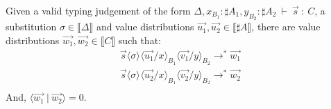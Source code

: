 \documentclass[runningheads,orivec,envcountsame,envcountsect]{llncs}
\newcommand\lra{\longrightarrow}
\newcommand\ansubst[2]{\ensuremath{\langle #1 \rangle_{#2}}}
\def\scal#1#2{\langle{#1}~|~{#2}\rangle}
\def\eval{\lra^*}
\def\sem#1{\llbracket#1\rrbracket}
\def\TYP#1#2#3{#1~{\vdash}~#2~{:}~#3}
\begin{document}
\begin{lemma}\label{lem:OrthogonalSubstitution} %
Given a valid typing judgement of the form $\TYP{\Delta, x_{B_1}:\sharp A_1, y_{B_2}: \sharp A_2}{\vec{s}}{C}$, a substitution $\sigma\in\sem{\Delta}$ and value distributions $\vec{u_1},\vec{u_2}\in\sem{\sharp A}$, there are value distributions $\vec{w_1},\vec{w_2}\in\sem{C}$ such that:
\[
\begin{array}{c}
    \vec{s}\ansubst{\sigma}{}\ansubst{\vec{u_1}/x}{B_1}{\ansubst{\vec{v_1}/y}{B_2}}\eval\vec{w_1}\\
    \vec{s}\ansubst{\sigma}{}\ansubst{\vec{u_2}/x}{B_1}{\ansubst{\vec{v_2}/y}{B_2}}\eval\vec{w_2}\\
\end{array}
\]
And, $\scal{\vec{w_1}}{\vec{w_2}} = 0$.
\end{lemma}
\end{document}
